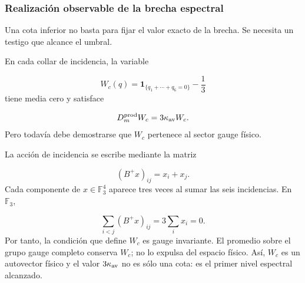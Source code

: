 \subsubsection{Realización observable de la brecha espectral}
Una cota inferior no basta para fijar el valor exacto de la brecha. Se necesita un testigo que alcance el umbral.\par
En cada collar de incidencia, la variable\par
\[
W_c(q)
=
\mathbf1_{\{q_1+\cdots+q_6=0\}}
-\frac13
\]
tiene media cero y satisface\par
\[
D_m^{\rm prod}W_c
=
3\kappa_{\rm av}W_c.
\]
Pero todavía debe demostrarse que \(W_c\) pertenece al sector gauge físico.\par
La acción de incidencia se escribe mediante la matriz\par
\[
(B^+x)_{ij}=x_i+x_j.
\]
Cada componente de \(x\in\mathbb F_3^4\) aparece tres veces al sumar las seis incidencias. En \(\mathbb F_3\),\par
\[
\sum_{i<j}(B^+x)_{ij}
=
3\sum_i x_i
=
0.
\]
Por tanto, la condición que define \(W_c\) es gauge invariante. El promedio sobre el grupo gauge completo conserva \(W_c\); no lo expulsa del espacio físico. Así, \(W_c\) es un autovector físico y el valor \(3\kappa_{\rm av}\) no es sólo una cota: es el primer nivel espectral alcanzado.\par
{}
